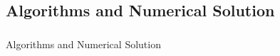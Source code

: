 \documentclass[aspectratio=169,xcolor=dvipsnames,10pt]{beamer}
\newcommand{\cJ}{\mathcal{J}}
\newcommand{\cZ}{\mathcal{Z}}
\newcommand{\risk}{\mathcal{R}}
\begin{document}



\subsection{Algorithms and Numerical Solution}

\begin{frame}\frametitle{}
\begin{center}\Large
Algorithms and Numerical Solution
\end{center}
\end{frame}
\end{document}
